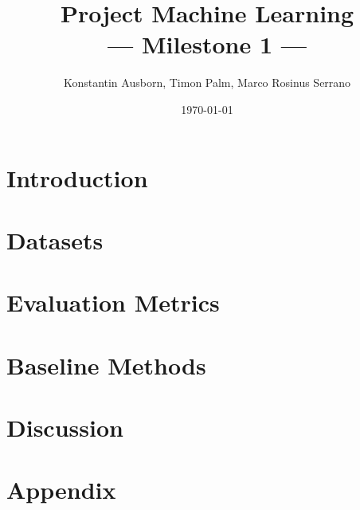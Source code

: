 \documentclass[10pt,a4paper,twoside]{article}
\title{Project Machine Learning\\--- Milestone 1 ---}
\author{Konstantin Ausborn, Timon Palm, Marco Rosinus Serrano}
\date{\today}
\begin{document}
    \maketitle
    \section{Introduction}\label{sec:introduction}
    
    \section{Datasets}\label{sec:datasets}
    
    \section{Evaluation Metrics}\label{sec:evaluation-metrics}
    
    \section{Baseline Methods}\label{sec:baseline-methods}
    
    \section{Discussion}\label{sec:discussion}
    
    
    \section{Appendix}\label{sec:appendix}
    
\end{document}
